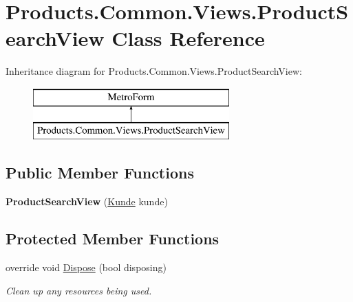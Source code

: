 \hypertarget{class_products_1_1_common_1_1_views_1_1_product_search_view}{}\section{Products.\+Common.\+Views.\+Product\+Search\+View Class Reference}
\label{class_products_1_1_common_1_1_views_1_1_product_search_view}
Inheritance diagram for Products.\+Common.\+Views.\+Product\+Search\+View\+:\begin{figure}[H]
\begin{center}
\leavevmode
\includegraphics[height=2.000000cm]{class_products_1_1_common_1_1_views_1_1_product_search_view}
\end{center}
\end{figure}
\subsection*{Public Member Functions}
\begin{DoxyCompactItemize}
\item 
{\bfseries Product\+Search\+View} (\hyperlink{class_products_1_1_model_1_1_entities_1_1_kunde}{Kunde} kunde)\hypertarget{class_products_1_1_common_1_1_views_1_1_product_search_view_a6b52f6292f12fc86618d18691355b5ee}{}\label{class_products_1_1_common_1_1_views_1_1_product_search_view_a6b52f6292f12fc86618d18691355b5ee}

\end{DoxyCompactItemize}
\subsection*{Protected Member Functions}
\begin{DoxyCompactItemize}
\item 
override void \hyperlink{class_products_1_1_common_1_1_views_1_1_product_search_view_af806a730579f560da7c5bd71c9fa26af}{Dispose} (bool disposing)
\begin{DoxyCompactList}\small\item\em Clean up any resources being used. \end{DoxyCompactList}\end{DoxyCompactItemize}


